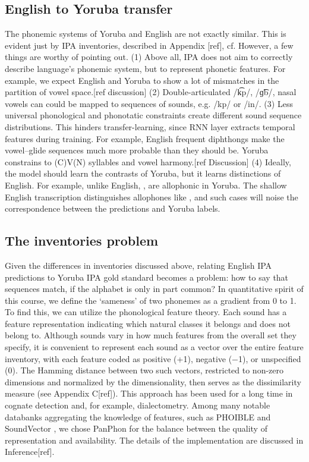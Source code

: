 \documentclass[11pt]{article}
\newcommand{\ipa}[1]{{\ipafont #1}}
\begin{document}
\subsection{English to Yoruba transfer}
The phonemic systems of Yoruba and English are not exactly similar. This is evident just by IPA inventories, described in Appendix [ref], cf. \cite{Adesola2024}\cite{AhiaEtAl2024}\cite{moran2014} However, a few things are worthy of pointing out. (1) Above all, IPA does not aim to correctly describe language's phonemic system, but to represent phonetic features. \cite{vanderhulst2017} For example, we expect English and Yoruba to show a lot of mismatches in the partition of vowel space.[ref discussion] (2) Double-articulated \ipa{/k͡p/}, \ipa{/ɡ͡b/}, nasal vowels can could be mapped to sequences of sounds, e.g. \ipa{/kp/} or \ipa{/in/}. (3) Less universal phonological and phonotatic constraints \citet{maddieson2010} create different sound sequence distributions. This hinders transfer-learning, since RNN layer extracts temporal features during training. For example, English frequent diphthongs make the vowel--glide sequences much more probable than they should be. Yoruba constrains to (C)V(N) syllables and vowel harmony.\cite{Przezdziecki2005}[ref Discussion] (4) Ideally, the model should learn the contrasts of Yoruba, but it learns distinctions of English. For example, unlike English, \ipa{[n ~ l]}, \ipa{[ɾ ~ ɹ]} are allophonic in Yoruba. The shallow English transcription distinguishes allophones like \ipa{[ɨ ~ i]}, and such cases will noise the correspondence between the predictions and Yoruba labels.

\subsection{The inventories problem} Given the differences in inventories discussed above, relating English IPA predictions to Yoruba IPA gold standard becomes a problem: how to say that sequences match, if the alphabet is only in part common? In quantitative spirit of this course, we define the `sameness' of two phonemes as a gradient from 0 to 1. To find this, we can utilize the phonological feature theory.\cite{chomsky1968}
Each sound has a feature representation indicating which natural classes it belongs and does not belong to. Although sounds vary in how much features from the overall set they specify, it is convenient to represent each sound as a vector over the entire feature inventory, with each feature coded as positive (+1), negative (−1), or unspecified (0). The Hamming distance between two such vectors, restricted to non-zero dimensions and normalized by the dimensionality, then serves as the dissimilarity measure (see Appendix C[ref]). This approach has been used for a long time in cognate detection and, for example, dialectometry.\citet{nerbonne2010} Among many notable databanks aggregating the knowledge of features, such as PHOIBLE \cite{moran2014} and SoundVector \cite{rubehn2024}, we chose PanPhon \cite{mortensen2016} for the balance between the quality of representation and availability. The details of the implementation are discussed in Inference[ref].
\end{document}

